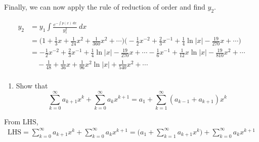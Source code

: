 \begin{solution}
    Finally, we can now apply the rule of reduction of order and find $y_2$.

    \begin{align*}
        y_2 &= y_1 \int \frac{e^{-\int p(x) \> dx}}{y_1^2} \>dx\\
        &= \biggl(1 + \frac{1}{3}x + \frac{1}{24}x^2 + \frac{1}{360}x^2 + \cdots \biggr) \biggl(-\frac{1}{2}x^{-2} + \frac{2}{3}x^{-1} + \frac{1}{4} \ln |x| - \frac{19}{270}x + \cdots\biggr)\\
        &= -\frac{1}{2}x^{-2} + \frac{2}{3}x^{-1} + \frac{1}{4} \ln |x| - \frac{19}{270}x + \cdots - \frac{1}{6}x^{-1} + \frac{1}{12}x \ln |x| - \frac{19}{810}x^2 + \cdots \\
        &\quad - \frac{1}{48} + \frac{1}{36}x + \frac{1}{96}x^2 \ln|x| + \frac{1}{540}x^2 + \cdots\\
    \end{align*}

\end{solution}

\begin{example}
    \begin{enumerate}
        \item Show that
        \[
            \sum^\infty_{k=0} a_{k+1}x^k + \sum^\infty_{k=0} a_kx^{k+1} = a_1 + \sum^\infty_{k=1} (a_{k-1} +
            a_{k+1})x^k
        \]
    \end{enumerate}
\end{example}
\begin{solution}
    From LHS,
    \begin{align*}
        \text{LHS} = \sum^\infty_{k=0} a_{k+1}x^k + \sum^\infty_{k=0} a_kx^{k+1}
        = \biggl( a_1 + \sum_{k=1}^{\infty} a_{k+1} x^k \biggr) + \sum_{k=0}^{\infty} a_k x^{k+1}
    \end{align*}
\end{solution}